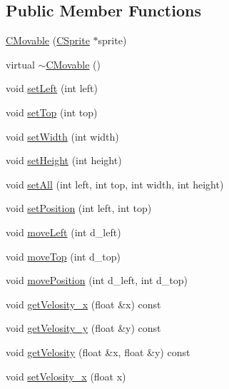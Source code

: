 \subsection*{Public Member Functions}
\begin{DoxyCompactItemize}
\item 
\hyperlink{classengine_1_1CMovable_af28d9429a4bf12fc37fb807bb0ae9c05}{C\-Movable} (\hyperlink{classengine_1_1CSprite}{C\-Sprite} $\ast$sprite)
\item 
virtual \hyperlink{classengine_1_1CMovable_a2a8adce4d82128afdde96d0c9eb724b7}{$\sim$\-C\-Movable} ()
\item 
void \hyperlink{classengine_1_1CMovable_aa4b25f57e8b5613035463f28eaa4fc36}{set\-Left} (int left)
\item 
void \hyperlink{classengine_1_1CMovable_a680ee306f10a10a79616e3483300edb0}{set\-Top} (int top)
\item 
void \hyperlink{classengine_1_1CMovable_af8a646f2cebafb3f1cec4934132e3128}{set\-Width} (int width)
\item 
void \hyperlink{classengine_1_1CMovable_a6e78d43b1968931da9c91e4657502025}{set\-Height} (int height)
\item 
void \hyperlink{classengine_1_1CMovable_a98ef52dedd948dc2cc6fd5cad92444c0}{set\-All} (int left, int top, int width, int height)
\item 
void \hyperlink{classengine_1_1CMovable_ad6342adfc04b24120e5b19cf77fe44f5}{set\-Position} (int left, int top)
\item 
void \hyperlink{classengine_1_1CMovable_aba30b69bd14b16076f3d11c7b0471b83}{move\-Left} (int d\-\_\-left)
\item 
void \hyperlink{classengine_1_1CMovable_ad8f9971aa2d8c6a056d9ca04a2aba195}{move\-Top} (int d\-\_\-top)
\item 
void \hyperlink{classengine_1_1CMovable_a680b7faa861881cca82952f01d0fb20e}{move\-Position} (int d\-\_\-left, int d\-\_\-top)
\item 
void \hyperlink{classengine_1_1CMovable_aa9c441a7c6ea04959db6968f78dd9158}{get\-Velosity\-\_\-x} (float \&x) const 
\item 
void \hyperlink{classengine_1_1CMovable_a082d0f378616726256e96724c3009493}{get\-Velosity\-\_\-y} (float \&y) const 
\item 
void \hyperlink{classengine_1_1CMovable_a7fa5504cad44efed5da9cc2298bed93b}{get\-Velosity} (float \&x, float \&y) const 
\item 
void \hyperlink{classengine_1_1CMovable_a9f1674b45a63529f2cf1bcbfd65c1a28}{set\-Velosity\-\_\-x} (float x)

\end{DoxyCompactItemize}
